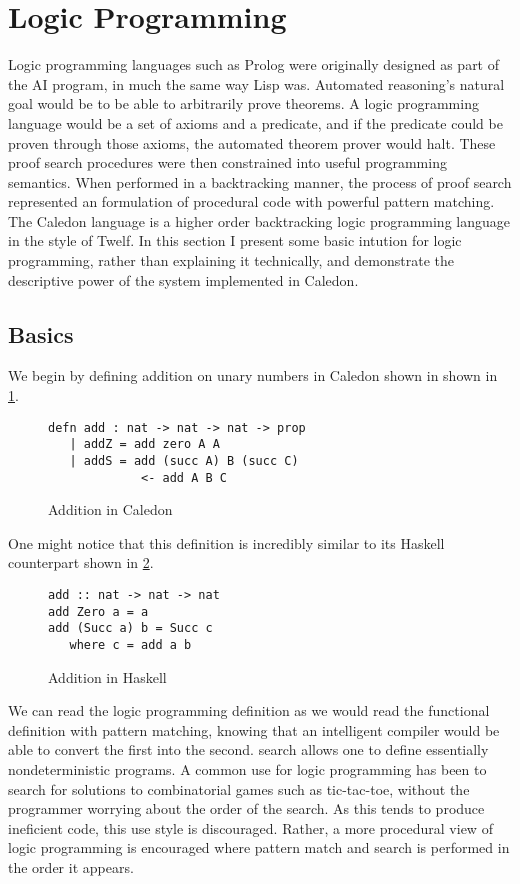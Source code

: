 \section{Logic Programming}

Logic programming languages such as Prolog were originally designed as part of the AI
program, in much the same way Lisp was. Automated reasoning’s natural goal would
be to be able to arbitrarily prove theorems. A logic programming language would be
a set of axioms and a predicate, and if the predicate could be proven through those axioms,
the automated theorem prover would halt. These proof search procedures were
then constrained into useful programming semantics. When performed in a backtracking
manner, the process of proof search represented an formulation of procedural code
with powerful pattern matching. The Caledon language is a higher order backtracking
logic programming language in the style of Twelf. In this section I present some basic
intution for logic programming, rather than explaining it technically, and demonstrate the 
descriptive power of the system implemented in Caledon.

\FloatBarrier
\subsection{Basics}
We begin by defining addition on unary numbers in Caledon shown in shown in \ref{code:add}.

\begin{figure}[H]
\begin{lstlisting}
defn add : nat -> nat -> nat -> prop
   | addZ = add zero A A
   | addS = add (succ A) B (succ C) 
             <- add A B C
\end{lstlisting}
\caption{Addition in Caledon}
\label{code:add}
\end{figure}

One might notice that this definition is incredibly similar to its Haskell counterpart shown in \ref{code:hask}.

\begin{figure}[H]
\begin{lstlisting}
add :: nat -> nat -> nat
add Zero a = a
add (Succ a) b = Succ c
   where c = add a b
\end{lstlisting}
\caption{Addition in Haskell}
\label{code:hask}
\end{figure}

We can read the logic programming definition as we would read the functional definition with pattern
matching, knowing that an intelligent compiler would be able to convert the first into the second.  
search allows one to define essentially nondeterministic programs. A common use for
logic programming has been to search for solutions to combinatorial games such as tic-tac-toe, 
without the programmer worrying about the order of the search. As this tends
to produce ineficient code, this use style is discouraged. Rather, a more procedural view of logic programming is encouraged where pattern match and search is performed
in the order it appears.

